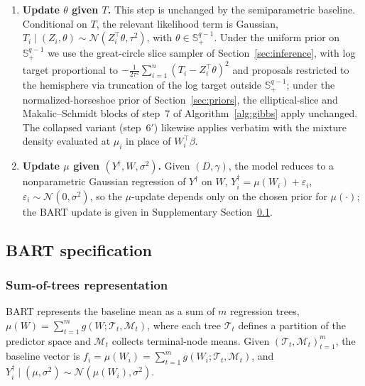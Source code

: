 \documentclass[11pt]{article}
\theoremstyle{definition}
\theoremstyle{plain}
\begin{document}
\begin{enumerate}[leftmargin=*,nosep]
\item \textbf{Update $\theta$ given $T$.}
This step is unchanged by the semiparametric baseline. Conditional on $T$, the relevant likelihood term is Gaussian, $T_i\mid(Z_i,\theta)\sim\mathcal N(Z_i^\top\theta,\tau^2)$, with $\theta\in\mathbb S^{q-1}_+$. Under the uniform prior on $\mathbb S^{q-1}_+$ we use the great-circle slice sampler of Section~\ref{sec:inference}, with log target proportional to $-\frac{1}{2\tau^2}\sum_{i=1}^n(T_i-Z_i^\top\theta)^2$ and proposals restricted to the hemisphere via truncation of the log target outside $\mathbb S^{q-1}_+$; under the normalized-horseshoe prior of Section~\ref{sec:priors}, the elliptical-slice and Makalic--Schmidt blocks of step~7 of Algorithm~\ref{alg:gibbs} apply unchanged. The collapsed variant (step~6$'$) likewise applies verbatim with the mixture density evaluated at $\mu_i$ in place of $W_i^\top\beta$.
\item \textbf{Update $\mu$ given $(Y^\dagger,W,\sigma^2)$.}
Given $(D,\gamma)$, the model reduces to a nonparametric Gaussian regression of $Y^\dagger$ on $W$, $Y_i^\dagger=\mu(W_i)+\varepsilon_i$, $\varepsilon_i\sim\mathcal N(0,\sigma^2)$,
so the $\mu$-update depends only on the chosen prior for $\mu(\cdot)$; the BART update is given in Supplementary Section~\ref{sec:bart_specification}.
\end{enumerate}

\subsection{BART specification}
\label{sec:bart_specification}

\subsubsection{Sum-of-trees representation}
BART \citep{Chipman2010} represents the baseline mean as a sum of $m$ regression trees, $\mu(W)=\sum_{t=1}^m g(W;\mathcal T_t,\mathcal M_t)$,
where each tree $\mathcal T_t$ defines a partition of the predictor space and $\mathcal M_t$ collects terminal-node means. Given $(\mathcal T_t,\mathcal M_t)_{t=1}^m$, the baseline vector is $f_i=\mu(W_i)=\sum_{t=1}^m g(W_i;\mathcal T_t,\mathcal M_t)$, and $Y_i^\dagger\mid(\mu,\sigma^2)\sim\mathcal N(\mu(W_i),\sigma^2)$.
\end{document}
